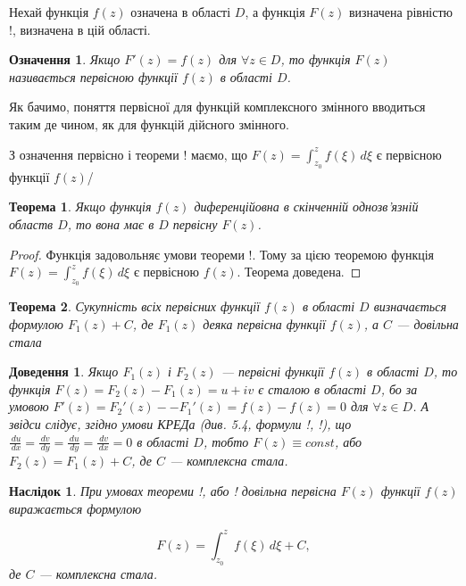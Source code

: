\documentclass[12pt,fleqn]{article}
\theoremstyle{theorem}
\newtheorem{thm}{Теорема}[section]
\newtheorem{ozn}{Означення}[section]
\theoremstyle{proof}
\newtheorem*{dov}{Доведення}
\newtheorem{corollary}{Наслідок}[section]
\numberwithin{figure}{section}
\numberwithin{equation}{section}
\begin{document}
Нехай функція $f(z)$ означена в області $D$, а функція $F(z)$ визначена рівністю !,  визначена в цій області.

\begin{ozn}
Якщо $F'(z)=f(z)$ для $\forall z\in D$, то функція $F(z)$ називається первісною функції $f(z)$ в області $D$.
\end{ozn}

Як бачимо, поняття первісної для функцій комплексного змінного вводиться таким де чином, як для функцій дійсного змінного.

З означення первісно і теореми ! маємо, що $F(z)= \int_{z_0}^{z} f(\xi) \,d\xi$ є первісною функції $f(z)$/

\begin{thm}
Якщо функція $f(z)$ диференційовна в скінченній однозв'язній областв $D$, то вона має в $D$ первісну $F(z)$.
\end{thm}

\begin{proof}
Функція  задовольняє умови теореми !. Тому за цією теоремою функція $F(z)= \int_{z_0}^{z} f(\xi) \,d\xi$ є первісною $f(z)$. Теорема доведена.
\end{proof}

\begin{thm}
Сукупність всіх первісних функції $f(z)$ в області $D$ визначається формулою $F_1(z)+C$, де $F_1(z)$ деяка первісна функції $f(z)$, а $C$ --- довільна стала
\end{thm}

\begin{dov}
Якщо $F_1(z)$ і $F_2(z)$ --- первісні функції $f(z)$ в області $D$, то функція $F(z)=F_2(z)-F_1(z)=u+iv$ є сталою в області $D$, бо за умовою $F'(z)=F_2'(z)- -F_1'(z)=f(z)-f(z)=0$ для $\forall z \in D$. А звідси слідує, згідно умови \emph{КРЕДа} (див. 5.4, формули !, !), що $\frac{\,du}{\,dx}=\frac{\,dv}{\,dy}=\frac{\,du}{\,dy}=\frac{\,dv}{\,dx}=0$ в області $D$, тобто $F(z)\equiv const$, або $F_2(z)=F_1(z)+C$, де $C$ --- комплексна стала.
\end{dov}

\begin{corollary}
При умовах теореми !, або ! довільна первісна $F(z)$ функції $f(z)$ виражається формулою

\begin{equation}\label{xy}
F(z)= \int_{z_0}^{z}f(\xi)\,d\xi + C,
\end{equation}
де $C$ --- комплексна стала.
\end{corollary}
\end{document}
